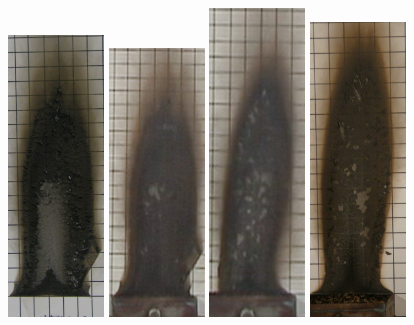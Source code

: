 \documentclass[twoside]{uocthesis}
\begin{document}
\begin{figure}[p]
	\includegraphics[width=1.0in]{../Figures/GBNG14_P5130378}
	\includegraphics[width=1.0in]{../Figures/GBNG15}
	\includegraphics[width=1.0in]{../Figures/GBNG16}
	\includegraphics[width=1.0in]{../Figures/GBNG17_P5130382}

\end{figure}
\end{document}
